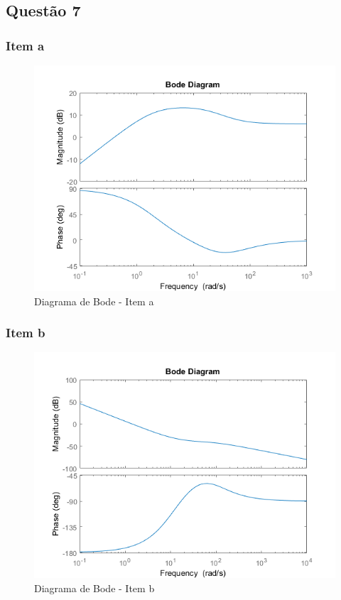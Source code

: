 \documentclass[a4paper, 12pt]{article}
\begin{document}
    \subsection{Quest\~{a}o 7}
        \subsubsection{Item a}
		\begin{figure}[!ht]
			\centering
			\includegraphics{img/Q7a.png}
			\caption{Diagrama de Bode - Item a}	
		\end{figure}	       
		\newpage 
        \subsubsection{Item b}
		\begin{figure}[!ht]
			\centering
			\includegraphics{img/Q7b.png}
			\caption{Diagrama de Bode - Item b}	
		\end{figure}       
		\newpage
\end{document}
